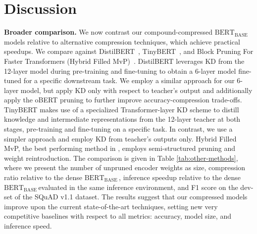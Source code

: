 \documentclass[11pt]{article}
\newcommand{\bert}{$\textrm{BERT}_{\textrm{BASE}}\,$}
\begin{document}
\section{Discussion}

\noindent\textbf{Broader comparison.} 
We now contrast our compound-compressed \bert models relative to alternative compression techniques, which achieve practical speedups. We compare against DistilBERT~\cite{Sanh2019DistilBERTAD}, TinyBERT~\cite{Jiao2020TinyBERTDB}, and Block Pruning For Faster Transformers (Hybrid Filled MvP)~\cite{lagunas21block}. 
DistilBERT leverages KD from the 12-layer model during pre-training and fine-tuning to obtain a 6-layer model fine-tuned for a specific downstream task. 
We employ a similar approach for our 6-layer model, but apply KD only with respect to teacher's output and additionally apply the oBERT pruning to further improve accuracy-compression trade-offs. TinyBERT makes use of a specialized Transformer-layer KD scheme to distill knowledge and intermediate representations from the 12-layer teacher at both stages, pre-training and fine-tuning on a specific task. In contrast, we use a simpler approach and employ KD from teacher's outputs only. Hybrid Filled MvP, the best performing method in \citet{lagunas21block}, employs semi-structured pruning and weight reintroduction. The comparison is given in Table \ref{tab:other-methods}, where we present the number of unpruned encoder weights as size, compression ratio relative to the dense \bert, inference speedup relative to the dense \bert evaluated in the same inference environment, and F1 score on the dev-set of the SQuAD v1.1 dataset. The results suggest that our compressed models improve upon the current state-of-the-art techniques, setting new very competitive baselines with respect to all metrics: accuracy, model size, and inference speed. 
\end{document}
